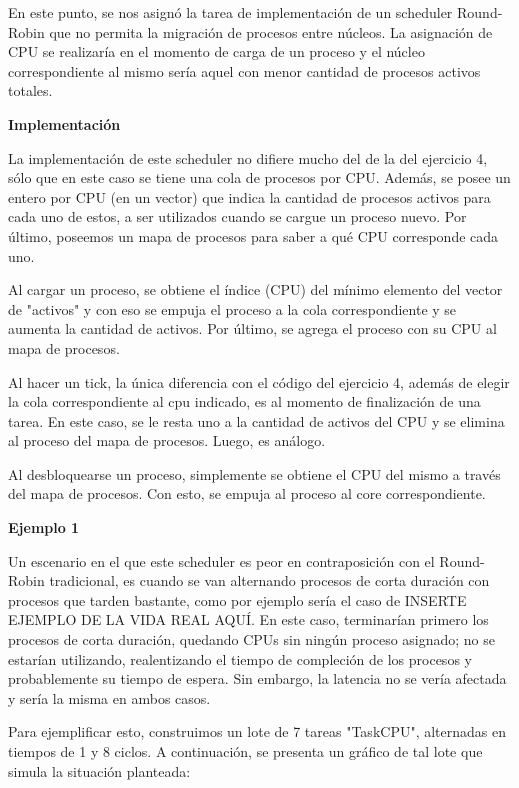 En este punto, se nos asignó la tarea de implementación de un scheduler Round-Robin que no permita la migración de procesos
entre núcleos. La asignación de CPU se realizaría en el momento de carga de un proceso y el núcleo correspondiente al mismo sería aquel con menor cantidad de procesos activos totales.

\bigskip

\textbf{Implementación}

La implementación de este scheduler no difiere mucho del de la del ejercicio 4, sólo que en este caso se tiene una cola de procesos por CPU. Además, se posee un entero por CPU (en un vector) que indica la cantidad de procesos activos para cada uno de estos, a ser utilizados cuando se cargue un proceso nuevo. Por último, poseemos un mapa de procesos para saber a qué CPU corresponde cada uno.

Al cargar un proceso, se obtiene el índice (CPU) del mínimo elemento del vector de "activos" y con eso se empuja el proceso a la cola correspondiente y se aumenta la cantidad de activos. Por último, se agrega el proceso con su CPU al mapa de procesos.

Al hacer un tick, la única diferencia con el código del ejercicio 4, además de elegir la cola correspondiente al cpu indicado, es al momento de finalización de una tarea. En este caso, se le resta uno a la cantidad de activos del CPU y se elimina al proceso del mapa de procesos. Luego, es análogo.

Al desbloquearse un proceso, simplemente se obtiene el CPU del mismo a través del mapa de procesos. Con esto, se empuja al proceso al core correspondiente.

\bigskip

\textbf{Ejemplo 1}

Un escenario en el que este scheduler es peor en contraposición con el Round-Robin tradicional, es cuando se van alternando procesos de corta duración con procesos que tarden bastante, como por ejemplo sería el caso de INSERTE EJEMPLO DE LA VIDA REAL AQUÍ. En este caso, terminarían primero los procesos de corta duración, quedando CPUs sin ningún proceso asignado; no se estarían utilizando, realentizando el tiempo de compleción de los procesos y probablemente su tiempo de espera. Sin embargo, la latencia no se vería afectada y sería la misma en ambos casos.

Para ejemplificar esto, construimos un lote de 7 tareas "TaskCPU", alternadas en tiempos de 1 y 8 ciclos. A continuación, se presenta un gráfico de tal lote que simula la situación planteada:

